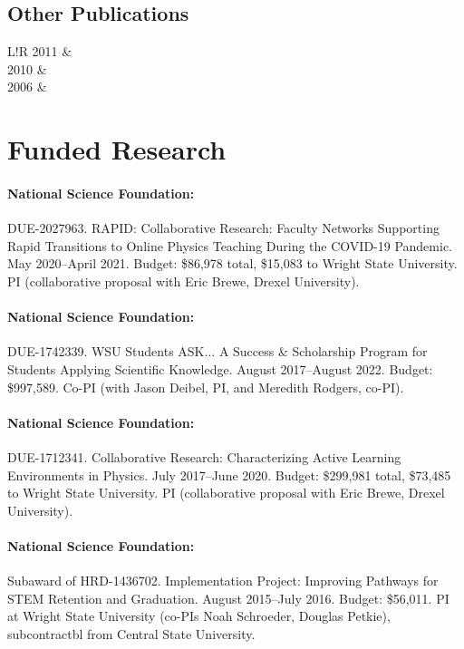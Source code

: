 \documentclass[10pt]{article}
\newcommand\VRule{\color{lightgray}\vrule width 0.5pt}
\begin{document}
\subsection*{Other Publications}
\begin{tabular}{L!{\VRule}R}
2011	& \\[5pt]
2010 	& \\[5pt]
2006 	& \\%
\end{tabular}
 
\section*{Funded Research}

\paragraph{National Science Foundation:} DUE-2027963. RAPID: Collaborative Research: Faculty Networks Supporting Rapid Transitions to Online Physics Teaching During the COVID-19 Pandemic. May 2020--April 2021. Budget: \$86,978 total, \$15,083 to Wright State University. PI (collaborative proposal with Eric Brewe, Drexel University).

\paragraph{National Science Foundation:} DUE-1742339. WSU Students ASK$\ldots$ A Success \& Scholarship Program for Students Applying Scientific Knowledge. August 2017--August 2022. Budget: \$997,589. Co-PI (with Jason Deibel, PI, and Meredith Rodgers, co-PI).

\paragraph{National Science Foundation:} DUE-1712341. Collaborative Research: Characterizing Active Learning Environments in Physics. July 2017--June 2020. Budget: \$299,981 total, \$73,485 to Wright State University. PI (collaborative proposal with Eric Brewe, Drexel University).

\paragraph{National Science Foundation:} Subaward of HRD-1436702. Implementation Project: Improving Pathways for STEM Retention and Graduation. August 2015--July 2016. Budget: \$56,011. PI at Wright State University (co-PIs Noah Schroeder, Douglas Petkie), subcontractbl from Central State University.
\end{document}
